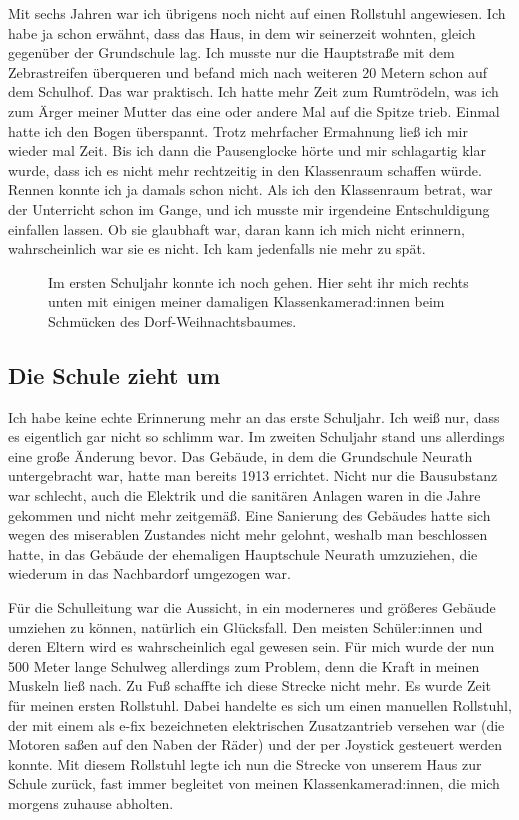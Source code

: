 \documentclass[fontsize=14pt,a4paper,headinclude,DIV=calc,automark]{scrbook}
\begin{document}
Mit sechs Jahren war ich übrigens noch nicht auf einen Rollstuhl angewiesen. Ich habe ja schon erwähnt, dass das Haus, in dem wir seinerzeit wohnten, gleich gegenüber der Grundschule lag. Ich musste nur die Hauptstraße mit dem Zebrastreifen überqueren und befand mich nach weiteren 20 Metern schon auf dem Schulhof. Das war praktisch. Ich hatte mehr Zeit zum Rumtrödeln, was ich zum Ärger meiner Mutter das eine oder andere Mal auf die Spitze trieb. Einmal hatte ich den Bogen überspannt. Trotz mehrfacher Ermahnung ließ ich mir wieder mal Zeit. Bis ich dann die Pausenglocke hörte und mir schlagartig klar wurde, dass ich es nicht mehr rechtzeitig in den Klassenraum schaffen würde. Rennen konnte ich ja damals schon nicht. Als ich den Klassenraum betrat, war der Unterricht schon im Gange, und ich musste mir irgendeine Entschuldigung einfallen lassen. Ob sie glaubhaft war, daran kann ich mich nicht erinnern, wahrscheinlich war sie es nicht. Ich kam jedenfalls nie mehr zu spät.

\setlength{\fboxsep}{0pt}    %
\setlength{\fboxrule}{0.2pt} %
\begin{figure}[ht]
    \centering
    \caption{Im ersten Schuljahr konnte ich noch gehen. Hier seht ihr mich rechts unten mit einigen meiner damaligen Klassenkamerad:innen beim Schmücken des Dorf-Weihnachtsbaumes.}
    \label{fig:schule2}
\end{figure}

\subsection{Die Schule zieht um}

Ich habe keine echte Erinnerung mehr an das erste Schuljahr. Ich weiß nur, dass es eigentlich gar nicht so schlimm war. Im zweiten Schuljahr stand uns allerdings eine große Änderung bevor. Das Gebäude, in dem die Grundschule Neurath untergebracht war, hatte man bereits 1913 errichtet. Nicht nur die Bausubstanz war schlecht, auch die Elektrik und die sanitären Anlagen waren in die Jahre gekommen und nicht mehr zeitgemäß. Eine Sanierung des Gebäudes hatte sich wegen des miserablen Zustandes nicht mehr gelohnt, weshalb man beschlossen hatte, in das Gebäude der ehemaligen Hauptschule Neurath umzuziehen, die wiederum in das Nachbardorf umgezogen war.

Für die Schulleitung war die Aussicht, in ein moderneres und größeres Gebäude umziehen zu können, natürlich ein Glücksfall. Den meisten Schüler:innen und deren Eltern wird es wahrscheinlich egal gewesen sein. Für mich wurde der nun 500 Meter lange Schulweg allerdings zum Problem, denn die Kraft in meinen Muskeln ließ nach. Zu Fuß schaffte ich diese Strecke nicht mehr. Es wurde Zeit für meinen ersten Rollstuhl. Dabei handelte es sich um einen manuellen Rollstuhl, der mit einem als e-fix bezeichneten elektrischen Zusatzantrieb versehen war (die Motoren saßen auf den Naben der Räder) und der per Joystick gesteuert werden konnte. Mit diesem Rollstuhl legte ich nun die Strecke von unserem Haus zur Schule zurück, fast immer begleitet von meinen Klassenkamerad:innen, die mich morgens zuhause abholten.
\end{document}
